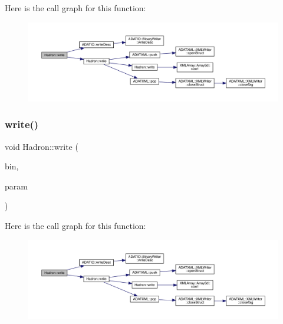 Here is the call graph for this function\+:
\nopagebreak
\begin{figure}[H]
\begin{center}
\leavevmode
\includegraphics[width=350pt]{d1/daf/namespaceHadron_a4beaf6ce4a67fc85ae046f257141250e_cgraph}
\end{center}
\end{figure}
\mbox{\label{namespaceHadron_a53c6ec066bb836eb7474a8a18be8fea7}} 
\subsubsection{\texorpdfstring{write()}{write()}\hspace{0.1cm}{\footnotesize\ttfamily [80/95]}}
{\footnotesize\ttfamily void Hadron\+::write (\begin{DoxyParamCaption}\item[{\mbox{\hyperlink{classADATIO_1_1BinaryWriter}{Binary\+Writer}} \&}]{bin,  }\item[{const \mbox{\hyperlink{structHadron_1_1KeyHadronSUNNPartIrrepOp__t_1_1CGPair__t}{Key\+Hadron\+S\+U\+N\+N\+Part\+Irrep\+Op\+\_\+t\+::\+C\+G\+Pair\+\_\+t}} \&}]{param }\end{DoxyParamCaption})}

Here is the call graph for this function\+:
\nopagebreak
\begin{figure}[H]
\begin{center}
\leavevmode
\includegraphics[width=350pt]{d1/daf/namespaceHadron_a53c6ec066bb836eb7474a8a18be8fea7_cgraph}
\end{center}
\end{figure}
\mbox{\label{namespaceHadron_a33192b7d206ee95549b4605c3db6cde8}} 
